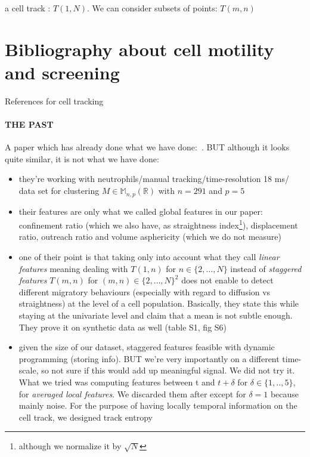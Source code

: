 \documentclass[12pt]{article}
\begin{document}
\noindent
a cell track : $T(1,N)$. We can consider subsets of points: $T(m,n)$
\section{Bibliography about cell motility and screening}
References for cell tracking \cite{pmid25630981}
\paragraph{THE PAST\\}
A paper which has already done what we have done:~\cite{pmid24324630}. BUT although it looks quite similar, it is not what we have done:
\begin{itemize}
\item they're working with neutrophils/manual tracking/time-resolution 18 ms/ data set for clustering $M \in \mathbb{M}_{n,p}(\mathbb{R})$ with $n=291$ and $p=5$
\item their features are only what we called global features in our paper: confinement ratio (which we also have, as straightness index\footnote{although we normalize it by $\sqrt{N}$}), displacement ratio, outreach ratio and volume asphericity (which we do not measure)
\item one of their point is that taking only into account what they call \textit{linear features} meaning dealing with $T(1,n)$ for $n \in \{2,\ldots,N\} $ instead of \textit{staggered features} $T(m,n)$ for $(m,n) \in \{2,\ldots,N\}^2 $ does not enable to detect different migratory behaviours (especially with regard to diffusion vs straightness) at the level of a cell population. Basically, they state this while staying at the univariate level and claim that a mean is not subtle enough. They prove it on synthetic data as well (table S1, fig S6)
\item given the size of our dataset, staggered features feasible with dynamic programming (storing info). BUT we're very importantly on a different time-scale, so not sure if this would add up meaningful signal. We did not try it. What we tried was computing features between t and $t+\delta$ for $\delta \in \{1,..,5\}$, for \textit{averaged local features}. We discarded them after except for $\delta =1$ because mainly noise. For the purpose of having locally temporal information on the cell track, we designed track entropy
\end{itemize}
\end{document}
